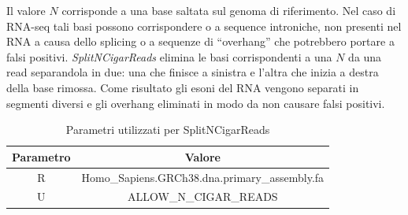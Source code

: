     Il valore $N$ corrisponde a una base saltata sul genoma di riferimento.
    Nel caso di RNA-seq tali basi possono corrispondere o a sequence introniche, non presenti nel RNA a causa dello splicing o a sequenze di ``overhang'' che potrebbero portare a falsi positivi.
    \emph{SplitNCigarReads} elimina le basi corrispondenti a una $N$ da una read separandola in due: una che finisce a sinistra e l'altra che inizia a destra della base rimossa.
    Come risultato gli esoni del RNA vengono separati in segmenti diversi e gli overhang eliminati in modo da non causare falsi positivi.\\
    \begin{table}[H]
        \centering
        \begin{tabular}{|c|c|}
                \hline
                Parametro & Valore\\
                \hline
                R & Homo\_Sapiens.GRCh38.dna.primary\_assembly.fa\\
                \hline
                U & ALLOW\_N\_CIGAR\_READS\\
                \hline
         \end{tabular}
         \caption{Parametri utilizzati per SplitNCigarReads}
    \end{table}

